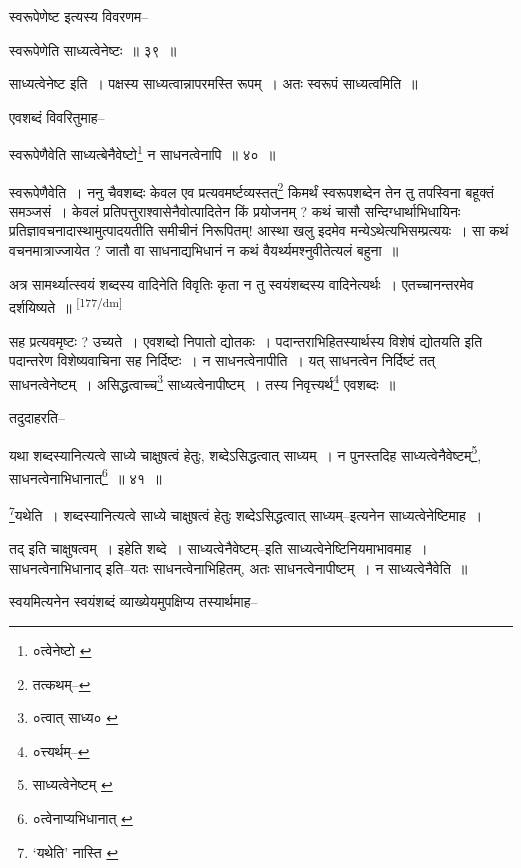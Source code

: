 \documentclass[article,12pt,a4paper]{memoir}
\begin{document}
	स्वरूपेणेष्ट इत्यस्य विवरणम-- 
	  
	स्वरूपेणेति साध्यत्वेनेष्टः ॥ ३९ ॥ 
	  
	साध्यत्वेनेष्ट इति । पक्षस्य साध्यत्वान्नापरमस्ति रूपम् । अतः स्वरूपं साध्यत्वमिति ॥ 
	  
	एवशब्दं विवरितुमाह-- 
	  
	स्वरूपेणैवेति साध्यत्बेनैवेष्टो\footnote{०त्वेनेष्टो \cite{dp-msC} \cite{dp-msB} \cite{dp-edH} \cite{dp-edP} \cite{dp-edE} \cite{dp-edN}} न साधनत्वेनापि ॥ ४० ॥ 
	  
	स्वरूपेणैवेति । ननु चैवशब्दः केवल एव प्रत्यवमर्ष्टव्यस्तत्\footnote{तत्कथम्--\cite{dp-msB}} किमर्थं स्वरूपशब्देन तेन तु तपस्विना बहूक्तं समञ्जसं । केवलं प्रतिपत्तुराश्वासेनैवोत्पादितेन किं प्रयोजनम् ? कथं चासौ सन्दिग्धार्थाभिधायिनः प्रतिज्ञावचनादास्थामुत्पादयतीति समीचीनं निरूपितम्! आस्था खलु इदमेव मन्येऽथेत्यभिसम्प्रत्ययः । सा कथं वचनमात्राज्जायेत ? जातौ वा साधनाद्यभिधानं न कथं वैयर्थ्यमश्नुवीतेत्यलं बहुना ॥
	\pend
      

	  \pstart अत्र सामर्थ्यात्स्वयं शब्दस्य वादिनेति विवृतिः कृता न तु स्वयंशब्दस्य वादिनेत्यर्थः । एतच्चानन्तरमेव दर्शयिष्यते ॥
	\pend
      \leavevmode\textsuperscript{\rmlatinfont\tiny [177/dm]}

	  \pstart सह प्रत्यवमृष्टः ? उच्यते । एवशब्दो निपातो द्योतकः । पदान्तराभिहितस्यार्थस्य विशेषं द्योतयति इति पदान्तरेण विशेष्यवाचिना सह निर्दिष्टः । न साधनत्वेनापीति । यत् साधनत्वेन निर्दिष्टं तत् साधनत्वेनेष्टम् । असिद्धत्वाच्च\footnote{०त्वात् साध्य० \cite{dp-msB}} साध्यत्वेनापीष्टम् । तस्य निवृत्त्यर्थ\footnote{०त्त्यर्थम्--\cite{dp-msD}} एवशब्दः ॥
	\pend
       

	  \pstart तदुदाहरति--
	\pend
       

	  \pstart यथा शब्दस्यानित्यत्वे साध्ये चाक्षुषत्वं हेतुः, शब्देऽसिद्धत्वात् साध्यम् । न पुनस्तदिह साध्यत्वेनैवेष्टम्\footnote{साध्यत्वेनेष्टम् \cite{dp-msC} \cite{dp-msD} \cite{dp-edE}}, साधनत्वेनाभिधानात्\footnote{०त्वेनाप्यभिधानात् \cite{dp-msB} \cite{dp-edP} \cite{dp-edH} \cite{dp-edE} \cite{dp-edN}} ॥ ४१ ॥
	\pend
       

	  \pstart \footnote{‘यथेति’ नास्ति \cite{dp-msA}}यथेति । शब्दस्यानित्यत्वे साध्ये चाक्षुषत्वं हेतुः शब्देऽसिद्धत्वात् साध्यम्--इत्यनेन साध्यत्वेनेष्टिमाह ।
	\pend
       

	  \pstart तद् इति चाक्षुषत्वम् । इहेति शब्दे । साध्यत्वेनैवेष्टम्--इति साध्यत्वेनेष्टिनियमाभावमाह । साधनत्वेनाभिधानाद् इति--यतः साधनत्वेनाभिहितम्, अतः साधनत्वेनापीष्टम् । न साध्यत्वेनैवेति ॥
	\pend
       

	  \pstart स्वयमित्यनेन स्वयंशब्दं व्याख्येयमुपक्षिप्य तस्यार्थमाह--
	\pend
       
\end{document}
